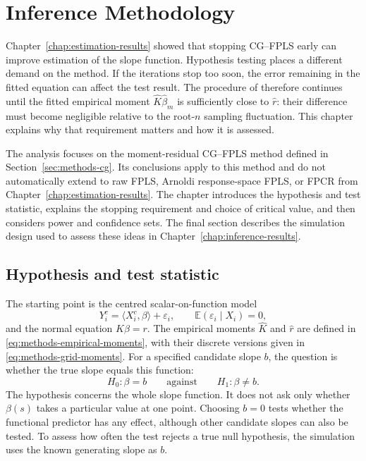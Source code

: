 \chapter{Inference Methodology}
\label{chap:inference-methodology}

Chapter~\ref{chap:estimation-results} showed that stopping CG--FPLS early can
improve estimation of the slope function.  Hypothesis testing places a
different demand on the method.  If the iterations stop too soon, the error
remaining in the fitted equation can affect the test result.  The procedure
of \textcite{babii_carrasco_tsafack_2026} therefore continues until the fitted
empirical moment $\widehat K\widehat\beta_m$ is sufficiently close to
$\widehat r$: their difference must become negligible relative to the
root-$n$ sampling fluctuation.  This chapter explains why that requirement
matters and how it is assessed.

The analysis focuses on the moment-residual CG--FPLS method defined in
Section~\ref{sec:methods-cg}.  Its conclusions apply to this method and do
not automatically extend to raw FPLS, Arnoldi response-space FPLS, or FPCR
from Chapter~\ref{chap:estimation-results}.  The chapter introduces the
hypothesis and test statistic, explains the stopping requirement and choice
of critical value, and then considers power and confidence sets.  The final
section describes the simulation design used to assess these ideas in
Chapter~\ref{chap:inference-results}.

\section{Hypothesis and test statistic}
\label{sec:inference-target}

The starting point is the centred scalar-on-function model
\begin{equation}
    Y_i^c=\langle X_i^c,\beta\rangle+\varepsilon_i,
    \qquad
    \mathbb E(\varepsilon_i\mid X_i)=0,
    \label{eq:inference-model}
\end{equation}
and the normal equation $K\beta=r$.  The empirical moments
$\widehat K$ and $\widehat r$ are defined in
\eqref{eq:methods-empirical-moments}, with their discrete versions given in
\eqref{eq:methods-grid-moments}.  For a specified candidate slope $b$, the
question is whether the true slope equals this function:
\begin{equation}
    H_0:\beta=b
    \qquad\text{against}\qquad
    H_1:\beta\neq b.
    \label{eq:inference-hypothesis}
\end{equation}
The hypothesis concerns the whole slope function.  It does not ask only
whether $\beta(s)$ takes a particular value at one point.  Choosing $b=0$
tests whether the functional predictor has any effect, although other
candidate slopes can also be tested.  To assess how often the test rejects
a true null hypothesis, the simulation uses the known generating slope as $b$.

